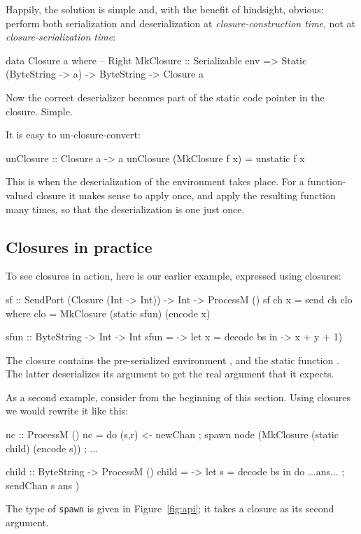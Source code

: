 \documentclass[preprint]{sigplanconf}
\begin{document}
Happily, the solution is simple and, with the benefit of hindsight,
obvious: perform both serialization and deserialization at \emph{closure-construction time},
not at \emph{closure-serialization time}:
\begin{code}
data Closure a where   -- Right
  MkClosure :: Serializable env
        => Static (ByteString -> a) 
        -> ByteString -> Closure a
\end{code}
Now the correct deserializer becomes part of the static code pointer 
in the closure.  Simple.

It is easy to un-closure-convert:
\begin{code}
  unClosure :: Closure a -> a
  unClosure (MkClosure f x) = unstatic f x
\end{code}
This is when the deserialization of the environment takes place. For a
function-valued closure it makes sense to apply  once, and
apply the resulting function many times, so that the deserialization is
one just once.

\subsection{Closures in practice} \label{s:closures-in-practice}

To see closures in action, here is our earlier  example, 
expressed using closures:
\begin{code}
  sf :: SendPort (Closure (Int -> Int)) 
     -> Int -> ProcessM ()
  sf ch x = send ch clo
    where
      clo  = MkClosure (static sfun) (encode x)

  sfun :: ByteString -> Int -> Int
  sfun = \bs -> let x = decode bs 
             in \y -> x + y + 1)
\end{code}
The closure contains the pre-serialized environment ,
and the static function . The latter deserializes its
argument  to get the real argument  that it expects.

As a second example, consider  from the beginning of this section.
Using closures we would rewrite it like this:
\begin{code}
  nc :: ProcessM ()
  nc = do { (s,r) <- newChan
          ; spawn node (MkClosure (static child) (encode s))
          ; ... }

  child :: ByteString -> ProcessM ()
  child = \bs -> let s = decode bs
              in do { ...ans...
                    ; sendChan s ans })
\end{code}
The type of \texttt{spawn} is given in Figure~\ref{fig:api}; it takes
a closure as its second argument.
\end{document}
